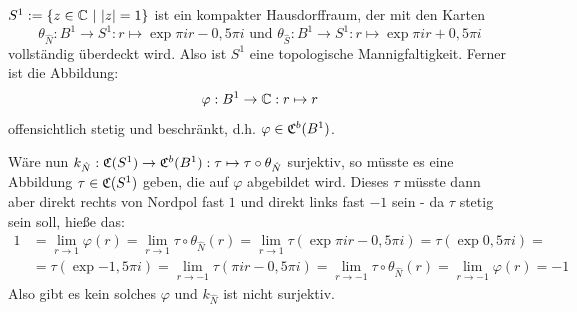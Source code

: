 \begin{bsp}\label{bsp:ohneNS} $S^1 := \{z \in \mathbb{C} ~|~ |z| = 1\}$ ist ein kompakter Hausdorffraum, der mit den Karten 
	\[\theta_{\hat{N}}: B^1 \to S^1: r \mapsto \exp{\pi i r - 0,5\pi i} \text{ und } \theta_{\hat{S}}: B^1 \to S^1: r \mapsto \exp{\pi i r + 0,5\pi i}\]
vollständig überdeckt wird. Also ist $S^1$ eine topologische Mannigfaltigkeit. Ferner ist die Abbildung:
	\[\varphi: B^1 \to \mathbb{C}: r \mapsto r\]
offensichtlich stetig und beschränkt, d.h. $\varphi \in \mathfrak{C}^b(B^1)$.

Wäre nun $k_{\hat{N}}: \mathfrak{C}(S^1) \to \mathfrak{C}^b(B^1): \tau \mapsto \tau \circ\theta_{\hat{N}}$ surjektiv, so müsste es eine Abbildung $\tau \in \mathfrak{C}(S^1)$ geben, die auf $\varphi$ abgebildet wird. Dieses $\tau$ müsste dann aber direkt \glqq rechts\grqq{} von Nordpol fast $1$ und direkt \glqq links\grqq{} fast $-1$ sein - da $\tau$ stetig sein soll, hieße das:
	\begin{align*}
		1 &= \lim_{r\to 1}\varphi(r) = \lim_{r\to 1} \tau\circ\theta_{\hat{N}}(r) = \lim_{r\to 1}\tau(\exp{\pi i r - 0,5\pi i}) =  \tau(\exp{0,5\pi i}) = \\
		 &=\tau(\exp{-1,5\pi i}) = \lim_{r\to -1} \tau(\pi i r - 0,5\pi i) = \lim_{r\to -1} \tau\circ\theta_{\hat{N}}(r) = \lim_{r\to -1}\varphi(r) = -1
	\end{align*}
Also gibt es kein solches $\varphi$ und $k_{\hat{N}}$ ist nicht surjektiv.
\end{bsp}


